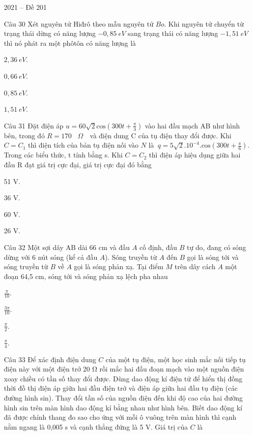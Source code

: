 \documentclass{book}
\begin{document}
\begin{quiz}{2021 – Đề 201}
\begin{multi}[points=1]{Câu 30}
 Xét nguyên tử Hiđrô theo mẫu nguyên tử $Bo$. Khi nguyên tử chuyển từ trạng thái dừng có năng lượng $-0,85~eV$ sang trạng thái có năng lượng $-1,51~eV$ thì nó phát ra một phôtôn có năng lượng là

\item  $2,36~eV$.	
\item  $0,66~eV$.	
\item  $0,85~eV$.	
\item*  $1,51~eV$.
\end{multi}

\begin{multi}[points=1]{Câu 31}
 Đặt điện áp  $u=60\sqrt{2}\text{cos}\left( 300t+\frac{\pi }{3} \right)$ vào hai đầu mạch AB như hình bên, trong đó $R=170~\text{ }\!\!\Omega\!\!\text{ }$ và điện dung C của tụ điện thay đổi được. Khi $C={{C}_{1}}$  thì điện tích của bản tụ điện nối vào $N$ là $~q=5\sqrt{2}{{.10}^{-4}}.\text{cos}\left( 300t+\frac{\pi }{6} \right)$. Trong các biểu thức, t tính bằng s. Khi $C={{C}_{2}}$ thì điện áp hiệu dụng giữa hai đầu R đạt giá trị cực đại, giá trị cực đại đó bằng

\item*  51 V.	
\item  36 V.	
\item  60 V.	
\item  26 V.
\end{multi}

\begin{multi}[points=1]{Câu 32}
 Một sợi dây AB dài 66 cm và đầu $A$ cố định, đầu $B$ tự do, đang có sóng dừng với 6 nút sóng (kể cả đầu $A$). Sóng truyền từ $A$ đến $B$ gọi là sóng tới và sóng truyền từ $B$ về $A$ gọi là sóng phản xạ. Tại điểm $M$ trên dây cách $A$ một đoạn 64,5 cm, sóng tới và sóng phản xạ lệch pha nhau

\item  $\frac{\pi }{10}$.	
\item  $\frac{3\pi }{10}$.	
\item  $\frac{\pi }{2}$.	
\item*  $\frac{\pi }{4}$. 
\end{multi}

\begin{multi}[points=1]{Câu 33}
 Để xác định điện dung $C$ của một tụ điện, một học sinh mắc nối tiếp tụ điện này với một điện trở 20 Ω rồi mắc hai đầu đoạn mạch vào một nguồn điện xoay chiều có tần số thay đổi được. Dùng dao động kí điện tử để hiển thị đồng thời đồ thị điện áp giữa hai đầu điện trở và điện áp giữa hai đầu tụ điện (các đường hình sin). Thay đổi tần số của nguồn điện đến khi độ cao của hai đường hình sin trên màn hình dao động kí bằng nhau như hình bên. Biết dao động kí đã được chỉnh thang đo sao cho ứng với mỗi ô vuông trên màn hình thì cạnh nằm ngang là 0,005 s và cạnh thẳng đứng là 5 V. Giá trị của $C$ là 


\end{multi}
\end{quiz}
\end{document}
